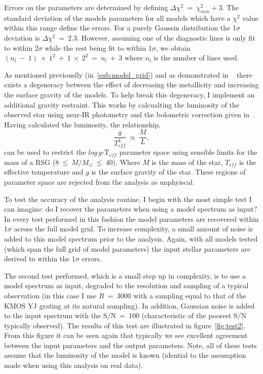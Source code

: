 Errors on the parameters are determined by defining
$\Delta\chi^{2}~=~\chi^{2}_{min} + 3$.
The standard deviation of the models parameters for all models which have a
$\chi^{2}$ value within this range define the errors.
For a purely Gaussin distribution the 1$\sigma$ deviation is $\Delta\chi^{2}~=~2.3$.
However, assuming one of the diagnostic lines is only fit to within 2$\sigma$ while the rest being fit to within 1$\sigma$, we obtain $(n_{l}~-~1)~\times~1^{2}~+~1~\times~2^{2}~=~n_{l}~+~3$
where $n_{l}$ is the number of lines used.

As mentioned previouslly (in~\ref{sub:model_grid}) and as demonstrated in
~\cite{2015ApJ...806...21D} there exists a degeneracy between the effect of decreasing the metallicity and increasing the surface gravity of the models.
To help break this degeneracy, I implement an additional gravity restraint.
This works by calcualting the luminosity of the observed star using near-IR photometry and the bolometric correction given in~\cite{Davies13b}.
Having calculated the luminosity, the relationship,
\begin{equation}
    \frac{g}{T^{4}_{eff}}~\propto~\frac{M}{L},
\end{equation}
can be used to restrict the $log\,g$-T$_{eff}$
parameter space using sensible limits for the mass of a RSG
($8~\leq~M/M_{\odot}~\leq~40$).
Where $M$ is the mass of the star,
$T_{eff}$ is the effective temperature and $g$ is the surface gravity of the star.
These regions of parameter space are rejected from the analysis as unphyiscal.

To test the accuracy of the analysis routine, I begin with the most simple test I can imagine:
do I recover the parameters when using a model spectrum as input?
In every test performed in this fashion the model parameters are recovered within 1$\sigma$ across the full model grid.
To increase complexity, a small amount of noise is added to this model spectrum prior to the analysis.
Again, with all models tested (which span the full grid of model parameters) the input stellar parameters are derived to within the 1$\sigma$ errors.

The second test performed, which is a small step up in complexity, is to use a model spectrum as input, degraded to the resolution and sampling of a typical observation (in this case I use $R~=~3000$ with a sampling equal to that of the KMOS YJ grating at its natural sampling).
In addition, Gaussian noise is added to the input spectrum with the S/N~=~100
(characteristic of the poorest S/N typically observed).
The results of this test are illustrated in figure~\ref{fig:test2}.
From this figure it can be seen again that typically we see excellent agreement between the input parameters and the output parameters.
Note, all of these tests assume that the luminosity of the model is known
(idential to the assumption made when using this analysis on real data).

